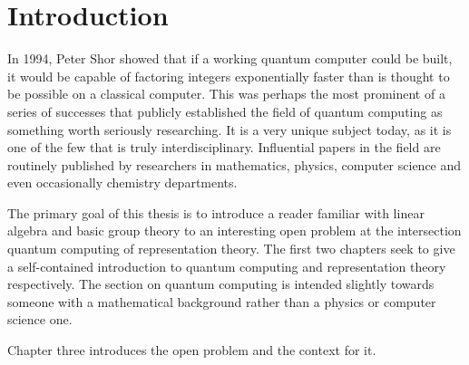 \chapter*{Introduction}


In 1994, Peter Shor showed that if a working quantum computer could be built, it would be capable of factoring 
integers exponentially faster than is thought to be possible on a classical computer. This was perhaps the most 
prominent of a series of successes that publicly established the field of quantum computing as something worth 
seriously researching. It is a very unique subject today, as it is one of the few that is truly interdisciplinary.  
Influential papers in the field are routinely published by researchers in mathematics, physics, computer science 
and even occasionally chemistry departments. 

The primary goal of this thesis is to introduce a reader familiar with linear algebra and basic group theory to an 
interesting open problem at the intersection quantum computing of representation theory. The first two chapters 
seek to give a self-contained introduction to quantum computing and representation theory respectively. The section 
on quantum computing is intended slightly towards someone with a mathematical background rather than a physics or 
computer science one.

Chapter three introduces the open problem and the context for it. 



